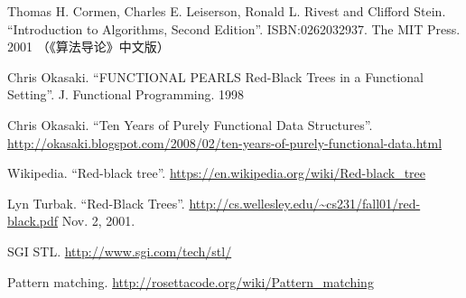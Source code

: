 \documentclass[b5paper]{ctexart}
\begin{document}
\ifx\wholebook\relax \else
\begin{thebibliography}{99}

Thomas H. Cormen, Charles E. Leiserson, Ronald L. Rivest and Clifford Stein.
``Introduction to Algorithms, Second Edition''. ISBN:0262032937. The MIT Press. 2001 （《算法导论》中文版）

Chris Okasaki. ``FUNCTIONAL PEARLS Red-Black Trees in a Functional Setting''. J. Functional Programming. 1998

Chris Okasaki. ``Ten Years of Purely Functional Data Structures''. \url{http://okasaki.blogspot.com/2008/02/ten-years-of-purely-functional-data.html}

Wikipedia. ``Red-black tree''. \url{https://en.wikipedia.org/wiki/Red-black_tree}

Lyn Turbak. ``Red-Black Trees''. \url{http://cs.wellesley.edu/~cs231/fall01/red-black.pdf} Nov. 2, 2001.

SGI STL. \url{http://www.sgi.com/tech/stl/}

Pattern matching. \url{http://rosettacode.org/wiki/Pattern_matching}

\end{thebibliography}

\expandafter\enddocument

\fi
\end{document}
